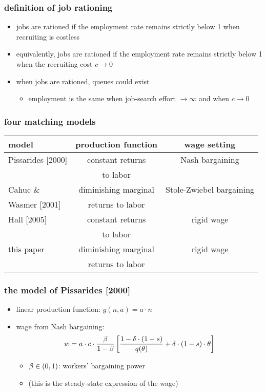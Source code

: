 \documentclass[12pt,xcolor={dvipsnames},hyperref={pdftex,pdfpagemode=UseNone,hidelinks,pdfdisplaydoctitle=true},usepdftitle=false]{beamer}
\begin{document}
\begin{frame}
\end{frame}

\begin{frame}
\frametitle{definition of job rationing}
\begin{itemize}
\item jobs are rationed if the employment rate remains strictly below 1 when recruiting is costless
\item equivalently, jobs are rationed if the employment rate remains strictly below 1 when the recruiting cost $c\to 0$ 
\item when jobs are rationed, queues could exist
\begin{itemize}
\item employment is the same when job-search effort $\to \infty$ and when $c\to 0$
\end{itemize}
\end{itemize}
\end{frame}

\begin{frame}
\frametitle{four matching models}
\begin{table}
\begin{tabular*}{\textwidth}{@{\extracolsep\fill}lcc}
 model &  production function & wage setting \\
\toprule
Pissarides [2000]  & constant returns & Nash bargaining \\
 & to labor &  \\
\midrule
Cahuc \& & diminishing marginal & Stole-Zwiebel bargaining  \\
Wasmer [2001] & returns to labor &  \\
\midrule
Hall [2005]  &  constant returns & rigid wage  \\
 &  to labor &  \\
\midrule
this paper & diminishing marginal & rigid wage  \\
&  returns to labor & \\
\bottomrule
\end{tabular*}
\end{table}
\end{frame}

\begin{frame}
\frametitle{the model of Pissarides [2000]}
\begin{itemize}
\item linear production function: $g(n,a)=a\cdot n$
\item wage from Nash bargaining:
\begin{equation*}
w=a\cdot c\cdot \frac{ \beta}{1-\beta} \left[ \frac{1-\delta\cdot (1-s)}{q(\theta)}+ \delta\cdot 
(1-s)\cdot \theta \right]
\end{equation*}
\begin{itemize}
\item $\beta\in(0,1)$: workers' bargaining power
\item (this is the steady-state expression of the wage)
\end{itemize}
\end{itemize}
\end{frame}
\end{document}
